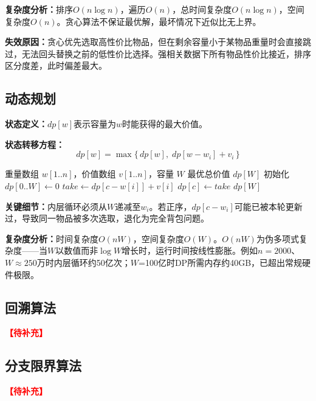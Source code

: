 \documentclass[6pt,a4paper]{ctexart}
\newcommand{\tb}{\textcolor{red}{\textbf{【待补充】}}}
\begin{document}
\textbf{复杂度分析：}排序$O(n \log n)$，遍历$O(n)$，总时间复杂度$O(n \log n)$，空间复杂度$O(n)$。贪心算法不保证最优解，最坏情况下近似比无上界。

\textbf{失效原因：}贪心优先选取高性价比物品，但在剩余容量小于某物品重量时会直接跳过，无法回头替换之前的低性价比选择。强相关数据下所有物品性价比接近，排序区分度差，此时偏差最大。

\subsection{动态规划}

\textbf{状态定义：}$dp[w]$表示容量为$w$时能获得的最大价值。

\textbf{状态转移方程：}
\begin{equation}
dp[w] = \max\{\,dp[w],\; dp[w - w_i] + v_i\,\}
\end{equation}

\begin{algorithm}[ht]
\caption{动态规划求解0/1背包}
\begin{algorithmic}[1]
\Require 重量数组 $w[1..n]$，价值数组 $v[1..n]$，容量 $W$
\Ensure 最优总价值 $dp[W]$
\State 初始化 $dp[0..W] \gets 0$
        \State $take \gets dp[c - w[i]] + v[i]$
            \State $dp[c] \gets take$
        \EndIf
    \EndFor
\EndFor
\State \Return $dp[W]$
\end{algorithmic}
\end{algorithm}

\textbf{关键细节：}内层循环必须从$W$递减至$w_i$。若正序，$dp[c - w_i]$可能已被本轮更新过，导致同一物品被多次选取，退化为完全背包问题。

\textbf{复杂度分析：}时间复杂度$O(nW)$，空间复杂度$O(W)$。$O(nW)$为伪多项式复杂度——当$W$以数值而非$\log W$增长时，运行时间按线性膨胀。例如$n=2000$、$W \approx 250$万时内层循环约50亿次；$W$=100亿时DP所需内存约40GB，已超出常规硬件极限。

\subsection{回溯算法}

\tb

\subsection{分支限界算法}

\tb
\end{document}
